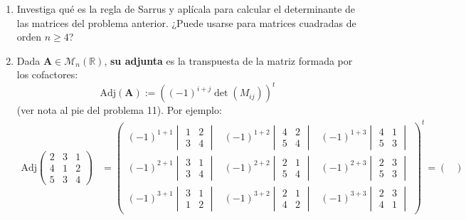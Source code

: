 \documentclass[8pt,a4paper]{article}
\begin{document}
\begin{enumerate}
		\item Investiga qué es la regla de Sarrus y aplícala para calcular el determinante de las matrices del problema anterior. ¿Puede usarse para matrices cuadradas de orden $n\geq 4$?

		\item Dada $\mathbf{A}\in\mathcal{M}_n(\mathbb{R})$, \textbf{su adjunta} es la transpuesta de la matriz formada por los cofactores:
%
			\[\textrm{Adj}(\mathbf{A}):=\left((-1)^{i+j}\det(M_{ij})\right)^t\]
%
(ver nota al pie del problema 11). Por ejemplo:
%
		\begin{align*}
		\mathrm{Adj}\begin{pmatrix} 2 & 3 & 1 \\ 4 & 1 & 2 \\ 5 & 3 & 4 \end{pmatrix}
		&=
		\begin{pmatrix}
			(-1)^{1+1}\begin{vmatrix}1&2\\3&4\end{vmatrix} & 
			(-1)^{1+2}\begin{vmatrix}4&2\\5&4\end{vmatrix} &
			(-1)^{1+3}\begin{vmatrix}4&1\\5&3\end{vmatrix} \\			
			(-1)^{2+1}\begin{vmatrix}3&1\\3&4\end{vmatrix} & 
			(-1)^{2+2}\begin{vmatrix}2&1\\5&4\end{vmatrix} &
			(-1)^{2+3}\begin{vmatrix}2&3\\5&3\end{vmatrix} \\
			(-1)^{3+1}\begin{vmatrix}3&1\\1&2\end{vmatrix} & 
			(-1)^{3+2}\begin{vmatrix}2&1\\4&2\end{vmatrix} &
			(-1)^{3+3}\begin{vmatrix}2&3\\4&1\end{vmatrix} 
		\end{pmatrix}^t
		=\begin{pmatrix}
		

\end{pmatrix}
\end{align*}
\end{enumerate}
\end{document}
